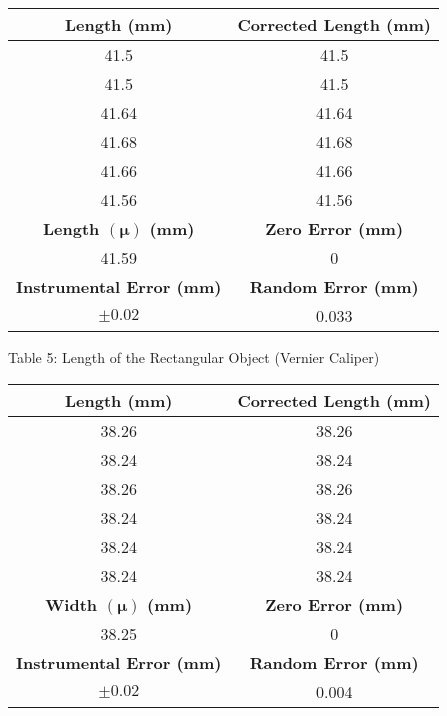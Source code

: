 \begin{center}
\begin{center}
    \begin{tabular}{|c|c|}
        \hline
        \textbf{Length (mm)} & \textbf{Corrected Length (mm)} \\
        \hline
        41.5 & 41.5 \\
        \hline
        41.5 & 41.5 \\
        \hline
        41.64 & 41.64 \\
        \hline
        41.68 & 41.68  \\
        \hline
        41.66 & 41.66  \\
        \hline
        41.56 & 41.56  \\
        \hline
        \hline
        \textbf{Length $(\bm{\mu})$ (mm)} & \textbf{Zero Error (mm)}  \\
        \hline
        41.59 & 0 \\
        \hline
        \hline
        \textbf{Instrumental Error (mm)} & \textbf{Random Error (mm)}  \\
        \hline
        \(\pm0.02\) & 0.033 \\
        \hline
    \end{tabular}
\end{center}
Table 5: Length of the Rectangular Object (Vernier Caliper)
\begin{center}
    \begin{tabular}{|c|c|}
        \hline
        \textbf{Length (mm)} & \textbf{Corrected Length (mm)} \\
        \hline
        38.26 & 38.26 \\
        \hline
        38.24 & 38.24 \\
        \hline
        38.26 & 38.26 \\
        \hline
        38.24 & 38.24  \\
        \hline
        38.24 & 38.24  \\
        \hline
        38.24 & 38.24  \\
        \hline
        \hline
        \textbf{Width $(\bm{\mu})$ (mm)} & \textbf{Zero Error (mm)}  \\
        \hline
        38.25 & 0 \\
        \hline
        \hline
        \textbf{Instrumental Error (mm)} & \textbf{Random Error (mm)}  \\
        \hline
        \(\pm0.02\) & 0.004 \\
        \hline
    \end{tabular}
\end{center}

\end{center}
